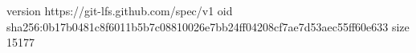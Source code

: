 version https://git-lfs.github.com/spec/v1
oid sha256:0b17b0481c8f6011b5b7c08810026e7bb24ff04208cf7ae7d53aec55ff60e633
size 15177
